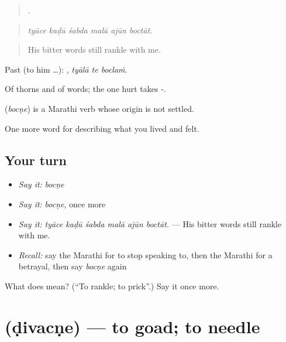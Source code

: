 \begin{quote}
     .
\end{quote}

\begin{quote}
\emph{tyāce kaḍū śabda malā ajūn boctāt.}
\end{quote}

\begin{quote}
His bitter words still rankle with me.
\end{quote}

Past (to him …):   , \emph{tyālā te boclaṁ}.

Of thorns and of words; the one hurt takes -.

\begin{cousinweb}
\textbf{} (\emph{bocṇe}) is a Marathi verb whose origin is not settled.
\end{cousinweb}

\begin{grammarlens}[title={What you've built}]
One more word for describing what you lived and felt.
\end{grammarlens}

\subsection*{Your turn}
\begin{itemize}
\raggedright
  \item \emph{Say it:} \emph{bocṇe}
  \item \emph{Say it:} \emph{bocṇe}, once more
  \item \emph{Say it:} \emph{tyāce kaḍū śabda malā ajūn boctāt.} — His bitter words still rankle with me.
  \item \emph{Recall:} say the Marathi for to stop speaking to, then the Marathi for a betrayal, then say \emph{bocṇe} again
\end{itemize}

\begin{tcolorbox}[breakable,colback=teal!4,colframe=teal!35!black,title={Before you move on}]
What does  mean? (\textquotedblleft{}To rankle; to prick\textquotedblright{}.) Say it once more.
\end{tcolorbox}
\section[\texorpdfstring{\mr{डिवचणे} (ḍivacṇe)}{डिवचणे (ḍivacṇe)}]{ (ḍivacṇe) — to goad; to needle}

